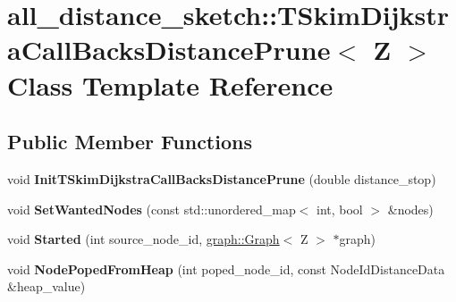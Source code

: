 \hypertarget{classall__distance__sketch_1_1TSkimDijkstraCallBacksDistancePrune}{}\section{all\+\_\+distance\+\_\+sketch\+:\+:T\+Skim\+Dijkstra\+Call\+Backs\+Distance\+Prune$<$ Z $>$ Class Template Reference}
\label{classall__distance__sketch_1_1TSkimDijkstraCallBacksDistancePrune}
\subsection*{Public Member Functions}
\begin{DoxyCompactItemize}
\item 
\hypertarget{classall__distance__sketch_1_1TSkimDijkstraCallBacksDistancePrune_a467e752dfbd2dc22a0fb175b956f5765}{}void {\bfseries Init\+T\+Skim\+Dijkstra\+Call\+Backs\+Distance\+Prune} (double distance\+\_\+stop)\label{classall__distance__sketch_1_1TSkimDijkstraCallBacksDistancePrune_a467e752dfbd2dc22a0fb175b956f5765}

\item 
\hypertarget{classall__distance__sketch_1_1TSkimDijkstraCallBacksDistancePrune_a72dcdb9dbe41c2a7bc2beefbf4466210}{}void {\bfseries Set\+Wanted\+Nodes} (const std\+::unordered\+\_\+map$<$ int, bool $>$ \&nodes)\label{classall__distance__sketch_1_1TSkimDijkstraCallBacksDistancePrune_a72dcdb9dbe41c2a7bc2beefbf4466210}

\item 
\hypertarget{classall__distance__sketch_1_1TSkimDijkstraCallBacksDistancePrune_a20cfa0d71c093815fe0660648f6667d6}{}void {\bfseries Started} (int source\+\_\+node\+\_\+id, \hyperlink{classall__distance__sketch_1_1graph_1_1Graph}{graph\+::\+Graph}$<$ Z $>$ $\ast$graph)\label{classall__distance__sketch_1_1TSkimDijkstraCallBacksDistancePrune_a20cfa0d71c093815fe0660648f6667d6}

\item 
\hypertarget{classall__distance__sketch_1_1TSkimDijkstraCallBacksDistancePrune_a0de5c64e1639099d7c55e8f4d63d1cdc}{}void {\bfseries Node\+Poped\+From\+Heap} (int poped\+\_\+node\+\_\+id, const Node\+Id\+Distance\+Data \&heap\+\_\+value)\label{classall__distance__sketch_1_1TSkimDijkstraCallBacksDistancePrune_a0de5c64e1639099d7c55e8f4d63d1cdc}


\end{DoxyCompactItemize}

